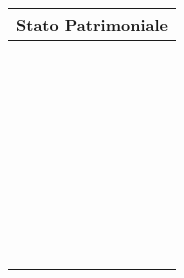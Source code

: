 \documentclass{book}
\begin{document}
\begin{longtable}{|m{6cm}|m{0.5cm}|m{6cm}|m{0.5cm}|}
    \hline
    \multicolumn{4}{|c|}{\textbf{Stato Patrimoniale}} \\
    \hline
    & & & \\
    \hline
    & & & \\
    \hline
    & & & \\
    \hline
    & & & \\
    \hline
    & & & \\
    \hline
    & & & \\
    \hline
    & & & \\
    \hline
    & & & \\
    \hline
    & & & \\
    \hline
    & & & \\
    \hline
    & & & \\
    \hline
    & & & \\
    \hline
    & & & \\
    \hline
    & & & \\
    \hline
    & & & \\
    \hline
    & & & \\
    \hline
    & & & \\
    \hline
    & & & \\
    \hline
    & & & \\
    \hline
    & & & \\
    \hline
    & & & \\
    \hline
    & & & \\
    \hline
    & & & \\
    \hline
    & & & \\
    \hline
    & & & \\
    \hline
    & & & \\
    \hline
    & & & \\
    \hline
    & & & \\
    \hline
    & & & \\
    \hline
    & & & \\
    \hline
    & & & \\
    \hline
    & & & \\
    \hline
    & & & \\
    \hline
    & & & \\
    \hline
    & & & \\
    \hline
    & & & \\
    \hline
    & & & \\
    \hline
    & & & \\

\end{longtable}
\end{document}
